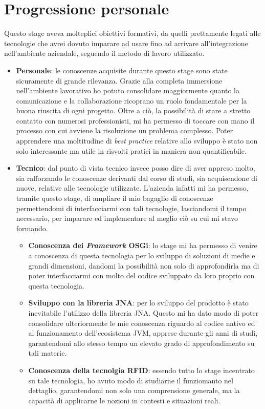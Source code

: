 \section{Progressione personale}
\label{sec:prog-personale}
Questo stage aveva molteplici obiettivi formativi, da quelli prettamente legati alle tecnologie che avrei dovuto imparare ad usare fino ad arrivare all’integrazione 
nell’ambiente aziendale, seguendo il metodo di lavoro utilizzato.
\begin{itemize}
    \item \textbf{Personale}: le conoscenze acquisite durante questo stage sono state sicuramente di grande rilevanza. Grazie alla completa immersione
    nell'ambiente lavorativo ho potuto consolidare maggiormente quanto la comunicazione e la collaborazione ricoprano un ruolo fondamentale per la buona riuscita di ogni progetto.
    Oltre a ciò, la possibilità di stare a stretto contatto con numerosi professionisti, mi ha permesso di toccare con mano il processo con cui avviene la risoluzione un problema complesso.
    Poter apprendere una moltitudine di \emph{best practice} relative allo sviluppo è stato non solo interessante ma utile in risvolti pratici in maniera non quantificabile.
    \item \textbf{Tecnico}: dal punto di vista tecnico invece posso dire di aver appreso molto, sia rafforzando le conoscenze derivanti dal corso di studi, 
    sia acquisendone di nuove, relative alle tecnologie utilizzate.
    L’azienda infatti mi ha permesso, tramite questo stage, di ampliare il mio bagaglio di conoscenze permettendomi di interfacciarmi con tali tecnologie, 
    lasciandomi il tempo necessario, per imparare ed implementare al meglio ciò su cui mi stavo formando.
    \begin{itemize}
        \item \textbf{Conoscenza dei \emph{Framework} OSGi}: lo stage mi ha permesso di venire a conoscenza di questa tecnologia per lo sviluppo di soluzioni di medie e grandi dimensioni,
        dandomi la possibilità non solo di approfondirla ma di poter interfacciarmi con molto del codice sviluppato da loro proprio con questa tecnologia.
        \item \textbf{Sviluppo con la libreria JNA}: per lo sviluppo del prodotto è stato inevitabile l'utilizzo della libreria JNA. Questo mi ha dato modo di poter consolidare
        ulteriormente le mie conoscenza riguardo al codice nativo ed al funzionamento dell'ecosistema JVM, apprese durante gli anni di studi, garantendomi allo stesso tempo
        un elevato grado di approfondimento su tali materie.
        \item \textbf{Conoscenza della tecnolgia RFID}: essendo tutto lo stage incentrato su tale tecnologia, ho avuto modo di studiarne il funziomanto nel dettaglio, garantendomi non solo
        una comprensione generale, ma la capacità di applicarne le nozioni in contesti e situazioni reali.
    \end{itemize}
\end{itemize}

